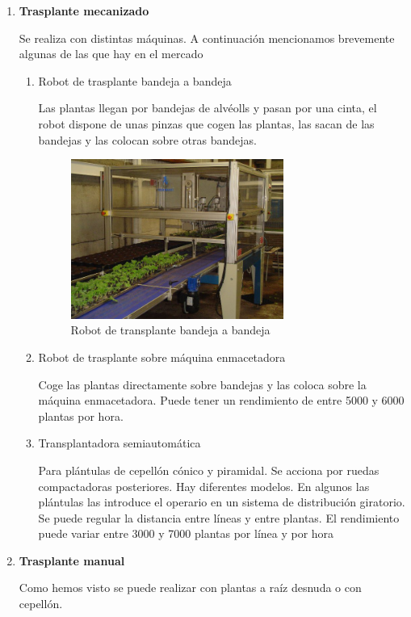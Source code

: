 \documentclass[a4paper,12pt,oneside]{article}
\begin{document}
\begin{enumerate}
\item \textbf{Trasplante mecanizado}
\label{sec:orgb74b6f2}

Se realiza con distintas máquinas. A continuación mencionamos brevemente algunas
de las que hay en el mercado

\begin{enumerate}
\item Robot de trasplante bandeja a bandeja
\label{sec:org9141f89}

Las plantas llegan por bandejas de alvéolls y pasan por una cinta, el robot
dispone de unas pinzas que cogen las plantas, las sacan de las bandejas y las
colocan sobre otras bandejas.

\begin{figure}[htbp]
\centering
\includegraphics[width=0.7\textwidth]{./img_uf1596/robot_bandeja.jpg}
\caption{Robot de transplante bandeja a bandeja}
\end{figure}
\item Robot de trasplante sobre máquina enmacetadora
\label{sec:orgffd2b1d}

Coge las plantas directamente sobre bandejas y las coloca sobre la máquina
enmacetadora. Puede tener un rendimiento de entre 5000 y 6000 plantas por hora. 
\item Transplantadora semiautomática
\label{sec:org139ccd8}

Para plántulas de cepellón cónico y piramidal. Se acciona por ruedas
compactadoras posteriores. Hay diferentes modelos. En algunos las plántulas las
introduce el operario en un sistema de distribución giratorio. Se puede regular
la distancia entre líneas y entre plantas. El rendimiento puede variar entre
3000 y 7000 plantas por línea y por hora
\end{enumerate}
\item \textbf{Trasplante manual}
\label{sec:org01a70dc}

Como hemos visto se puede realizar con plantas a raíz desnuda o con cepellón.
\end{enumerate}
\end{document}

